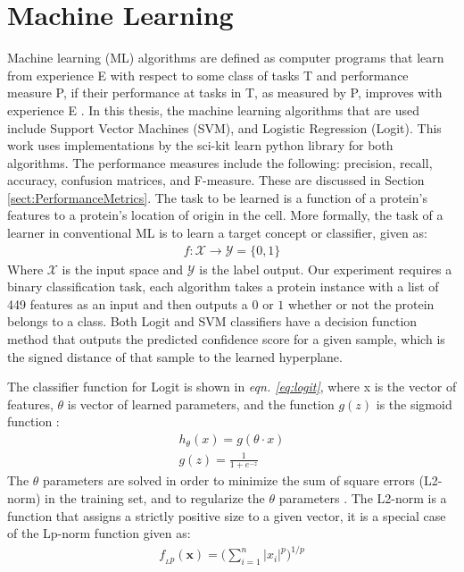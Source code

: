 \documentclass[ms]{nuthesis}
\begin{document}
\section{Machine Learning}
\label{sect:machineLearn}
Machine learning (ML) algorithms are defined as computer programs that learn from experience E
with respect to some class of tasks T and performance measure P, if their performance at
tasks in T, as measured by P, improves with experience E \cite{mitchell}. In this thesis,
the machine learning algorithms that are used include Support Vector Machines (SVM), and Logistic Regression (Logit).
 This work uses implementations by the sci-kit learn python library \cite{sklearn-api} for both algorithms. The performance
 measures include the following: precision, recall, accuracy, confusion matrices, and F-measure. These are discussed in
 Section \ref{sect:PerformanceMetrics}. The task to be learned is a function of a protein's
    features to a protein's location of origin in the cell. More formally, the task of a learner in conventional ML
    is to learn a target concept or classifier, given as:
 \FloatBarrier
\begin{equation}
\label{eq:convML}
\begin{aligned}
f : {\mathcal X} \rightarrow {\mathcal Y}=\{0, 1\}
\end{aligned}
\end{equation}
\FloatBarrier
Where $\mathcal X$ is the input space and $\mathcal Y$ is the label output. Our experiment requires a binary
classification task, each algorithm takes a protein instance with a list of 449 features
 as an input and then outputs a $0$ or $1$ whether or not the protein belongs to a class.
 Both Logit and SVM classifiers have a decision function method that outputs
 the predicted confidence score for a given sample, which is the signed distance of that sample to the learned
 hyperplane.
 \par The classifier function for Logit is shown in \textit{eqn. \ref{eq:logit}},
 where x is the vector of features, $\theta$ is vector of learned parameters, and
 the function $g(z)$ is the sigmoid
 function \cite{Coursera}:
\FloatBarrier
\begin{equation}
\label{eq:logit}
\begin{aligned}
h_{\theta}(x) = g(\theta \cdot x) \\
g(z) = \frac{1}{1+e^{-z}}
\end{aligned}
\end{equation}
\FloatBarrier
The $\theta$ parameters are solved in order to minimize the sum of square errors (L2-norm) in the
training set, and to regularize the $\theta$ parameters \cite{scikit-learn}. The
L2-norm is a function that assigns a strictly positive size to a given vector, it is a special case
of the Lp-norm function given as:
\FloatBarrier
\begin{equation}
\label{eq:lpNormFcn}
\begin{aligned}
f_{_Lp}(\mathbf{x}) = \bigg( \sum_{i=1}^n \left| x_i \right| ^p \bigg) ^{1/p}
\end{aligned}
\end{equation}
\FloatBarrier
\end{document}
